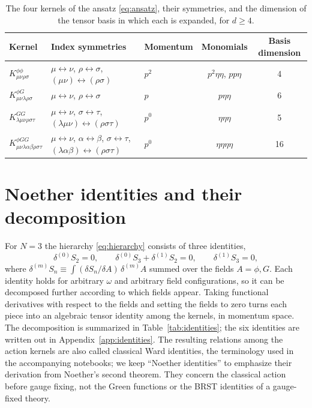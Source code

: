 \documentclass[prd,aps,preprint,nofootinbib,amsmath,amssymb,eqsecnum]{revtex4-2}
\begin{document}
\begin{table}[htb]
\centering
\setlength{\tabcolsep}{10pt}
\begin{tabular}{@{}lp{4.6cm}lcc@{}}
\toprule
Kernel & \raggedright Index symmetries & Momentum & Monomials & Basis dimension \\
\midrule
$K^{\phi\phi}_{\mu\nu\rho\sigma}$ & \raggedright $\mu\leftrightarrow\nu$, $\rho\leftrightarrow\sigma$, $(\mu\nu)\leftrightarrow(\rho\sigma)$ & $p^2$ & $p^2\eta\eta$, $pp\eta$ & 4 \\
$K^{\phi G}_{\mu\nu\lambda\rho\sigma}$ & \raggedright $\mu\leftrightarrow\nu$, $\rho\leftrightarrow\sigma$ & $p$ & $p\eta\eta$ & 6 \\
$K^{GG}_{\lambda\mu\nu\rho\sigma\tau}$ & \raggedright $\mu\leftrightarrow\nu$, $\sigma\leftrightarrow\tau$, $(\lambda\mu\nu)\leftrightarrow(\rho\sigma\tau)$ & $p^0$ & $\eta\eta\eta$ & 5 \\
$K^{\phi GG}_{\mu\nu\lambda\alpha\beta\rho\sigma\tau}$ & \raggedright $\mu\leftrightarrow\nu$, $\alpha\leftrightarrow\beta$, $\sigma\leftrightarrow\tau$, $(\lambda\alpha\beta)\leftrightarrow(\rho\sigma\tau)$ & $p^0$ & $\eta\eta\eta\eta$ & 16 \\
\bottomrule
\end{tabular}
\caption{The four kernels of the ansatz \eqref{eq:ansatz}, their symmetries, and the
dimension of the tensor basis in which each is expanded, for $d\geq4$.}
\label{tab:kernels}
\end{table}

\section{Noether identities and their decomposition}
\label{sec:identities}

For $N=3$ the hierarchy \eqref{eq:hierarchy} consists of three identities,
\begin{equation}
\delta^{(0)}S_2=0,\qquad
\delta^{(0)}S_3+\delta^{(1)}S_2=0,\qquad
\delta^{(1)}S_3=0,
\label{eq:noether}
\end{equation}
where $\delta^{(m)}S_n\equiv\int(\delta S_n/\delta A)\,\delta^{(m)}A$ summed over the
fields $A=\phi,G$. Each identity holds for arbitrary $\omega$ and arbitrary field
configurations, so it can be decomposed further according to which fields appear. Taking
functional derivatives with respect to the fields and setting the fields to zero turns each
piece into an algebraic tensor identity among the kernels, in momentum space. The
decomposition is summarized in Table~\ref{tab:identities}; the six identities are written out
in Appendix~\ref{app:identities}. The resulting relations among the action kernels are also
called classical Ward identities, the terminology used in the accompanying notebooks; we
keep ``Noether identities'' to emphasize their derivation from Noether's second theorem.
They concern the classical action before gauge fixing, not the Green functions or the BRST
identities of a gauge-fixed theory.
\end{document}
